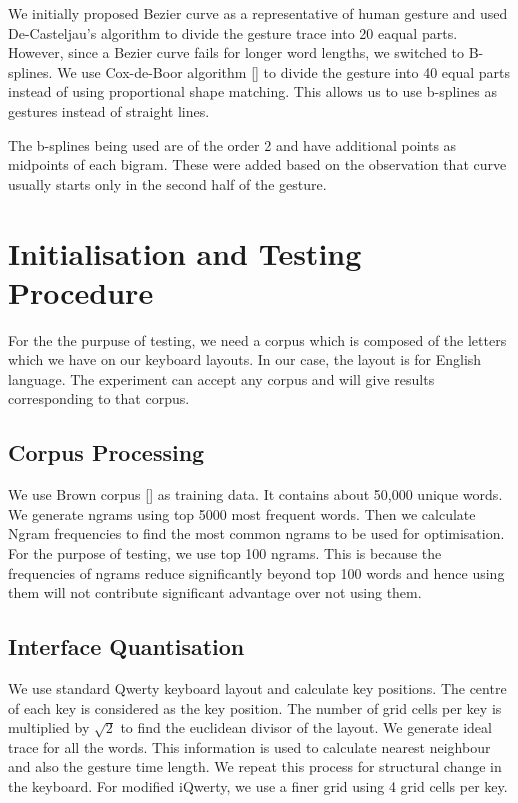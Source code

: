 \documentclass[MTech]{iitmdiss}
\begin{document}
We initially proposed Bezier curve as a representative of human gesture and used De-Casteljau's algorithm to divide the gesture trace into 20 eaqual parts. However, since a Bezier curve fails for longer word lengths, we switched to B-splines.
We use Cox-de-Boor algorithm [\cite{deboor}] to divide the gesture into 40 equal parts instead of using proportional shape matching. This allows us to use b-splines as gestures instead of straight lines.

The b-splines being used are of the order 2 and have additional points as midpoints of each bigram. These were added based on the observation that curve usually starts only in the second half of the gesture.

\chapter{Initialisation and Testing Procedure}
For the the purpuse of testing, we need a corpus which is composed of the letters which we have on our keyboard layouts. In our case, the layout is for English language. The experiment can accept any corpus and will give results corresponding to that corpus.

\section{Corpus Processing}
We use Brown corpus [\cite{brown}] as training data. It contains about 50,000 unique words.
We generate ngrams using top 5000 most frequent words.
Then we calculate Ngram frequencies to find the most common ngrams to be used for optimisation. For the purpose of testing, we use top 100 ngrams. This is because the frequencies of ngrams reduce significantly beyond top 100 words and hence using them will not contribute significant advantage over not using them.

\section{Interface Quantisation}
We use standard Qwerty keyboard layout and calculate key positions.
The centre of each key is considered as the key position.
The number of grid cells per key is multiplied by $\sqrt{2}$ to find the euclidean divisor of the layout.
We generate ideal trace for all the words. 
This information is used to calculate nearest neighbour and also the gesture time length.
We repeat this process for structural change in the keyboard. For modified iQwerty, we use a finer grid using 4 grid cells per key.
\end{document}
